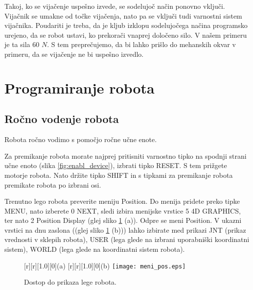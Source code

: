Takoj, ko se vijačenje uspešno izvede, se sodelujoč način ponovno vključi. Vijačnik se umakne od točke vijačenja, nato pa se vključi tudi varnostni sistem vijačnika. Poudariti je treba, da je kljub izklopu sodelujočega načina programsko urejeno, da se robot ustavi, ko prekorači vnaprej določeno silo. V našem primeru je ta sila $60$ $N$. S tem preprečujemo, da bi lahko prišlo do mehanskih okvar v primeru, da se vijačenje ne bi uspešno izvedlo. 

\newpage

\section{Programiranje robota}

\subsection{Ročno vodenje robota}

Robota ročno vodimo s pomočjo ročne učne enote. 

\begin{mdframed}[backgroundcolor=yellow!20, shadow=true,roundcorner=8pt]

Za premikanje robota morate najprej pritisniti varnostno tipko na spodnji strani učne enoto (slika \ref{fig:enabl_device}), izbrati tipko RESET. S tem prižgete motorje robota. Nato držite tipko SHIFT in s tipkami za premikanje robota premikate robota po izbrani osi.

\end{mdframed}

\begin{mdframed}[backgroundcolor=yellow!20, shadow=true,roundcorner=8pt]
	
Trenutno lego robota preverite meniju Position. Do menija pridete preko tipke MENU, nato izberete 0 NEXT, sledi izbira menijske vrstice 5 4D GRAPHICS, ter nato 2 Position Display (glej sliko \ref{fig:menu_pos} (a)). Odpre se meni Position. V ukazni vrstici na dnu zaslona ((glej sliko \ref{fig:menu_pos} (b))) lahko izbirate med prikazi JNT (prikaz vrednosti v sklepih robota), USER (lega glede na izbrani uporabniški koordinatni sistem), WORLD (lega glede na koordinatni sistem robota).
	
\end{mdframed}

\begin{figure}[!hbt]
	\centering
	[r][1.0][0]{(a)}
	[r][1.0][0]{(b)}
	\texttt{[image: meni\_pos.eps]}
	\caption{Dostop do prikaza lege robota.}
	\label{fig:menu_pos}
\end{figure}

